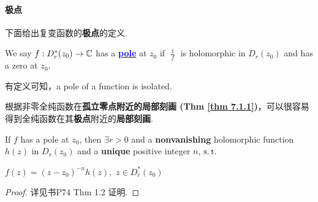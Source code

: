 \vspace{2em}
\paragraph{极点}
	下面给出复变函数的\textbf{极点}的定义.
	\begin{defn}\label{def 7.1.2}
		We say $f : D_{r}^{*}(z_0) \rightarrow \mathbb{C}$ has a \underline{\textcolor{blue}{\textbf{pole}}} at $z_0$ if $\,\, \frac{1}{f} \,\,$ is holomorphic in $D_{r}(z_0)$ and has a zero at $z_0$.
		
		\begin{rmk}
			有定义可知，a pole of a function is isolated.
		\end{rmk}
	\end{defn}

	\vspace{2em}
	根据非零全纯函数在\textbf{孤立零点附近的局部刻画 (Thm \ref{thm 7.1.1})}，可以很容易得到全纯函数在其\textbf{极点}附近的\textbf{局部刻画}.
	\begin{thm}\label{thm 7.1.2}
		If $f$ has a pole at $z_0$, then $\exists r > 0$ and a \textbf{nonvanishing} holomorphic function $h(z)$ in $D_{r}(z_0)$ and a \textbf{unique} positive integer $n$, $\operatorname{s.t.}$
		\begin{center}
			$f(z) = (z - z_0)^{-n} h(z) , \,\, z \in D_{r}^{*}(z_0)$
		\end{center}
	
		\vspace{2em}
		\begin{proof}
			详见书P74 Thm 1.2 证明.
		\end{proof}
	\end{thm}

\newpage
